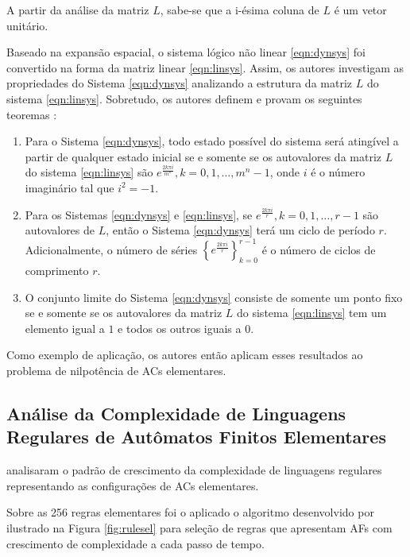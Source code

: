 \documentclass[12pt,a4paper]{article}
\begin{document}
A partir da análise da matriz $L$, sabe-se que a i-ésima coluna de $L$ é um
vetor unitário.

Baseado na expansão espacial, o sistema lógico não linear \ref{eqn:dynsys}
foi convertido na forma da matriz linear \ref{eqn:linsys}. Assim, os autores
investigam as propriedades do Sistema \ref{eqn:dynsys} analizando a estrutura
da matriz $L$ do sistema \ref{eqn:linsys}. Sobretudo, os autores definem e
provam os seguintes teoremas :

\begin{enumerate}
\item Para o Sistema \ref{eqn:dynsys}, todo estado possível do sistema será
atingível a partir de qualquer estado inicial se e somente se os autovalores
da matriz $L$ do sistema \ref{eqn:linsys} são
$e^{\frac{2k\pi i}{m^n}},k=0,1,\ldots,m^n-1$, onde $i$ é o número
imaginário tal que $i^2=-1$.

\item Para os Sistemas \ref{eqn:dynsys} e \ref{eqn:linsys}, se
$e^{\frac{2k\pi i}{r}},k=0,1,\ldots,r-1$ são autovalores de $L$, então o
Sistema \ref{eqn:dynsys} terá um ciclo de período $r$. Adicionalmente,
o número de séries $\left\{e^{\frac{2k\pi i}{r}}\right\}^{r-1}_{k=0}$
é o número de ciclos de comprimento $r$.

\item O conjunto limite do Sistema \ref{eqn:dynsys} consiste de somente um
ponto fixo se e somente se os autovalores da matriz $L$ do sistema \ref{eqn:linsys}
tem um elemento igual a $1$ e todos os outros iguais a $0$.
\end{enumerate}

Como exemplo de aplicação, os autores então aplicam esses resultados ao
problema de nilpotência de ACs elementares.

\subsection{Análise da Complexidade de Linguagens Regulares de Autômatos
Finitos Elementares}

 analisaram o padrão de crescimento da complexidade
de linguagens regulares representando as configurações de ACs
elementares.

Sobre as 256 regras elementares foi o aplicado o algoritmo desenvolvido
por  ilustrado na Figura \ref{fig:rulesel} para
seleção de regras que apresentam AFs com crescimento de
complexidade a cada passo de tempo.
\end{document}
